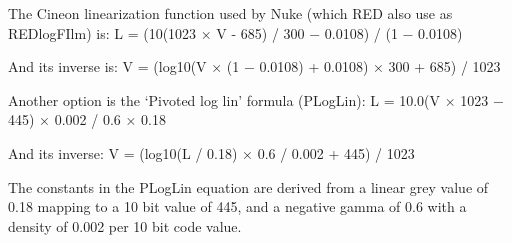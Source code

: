 The Cineon linearization function used by Nuke (which RED also use as REDlogFIlm) is:
	L = (10(1023 × V - 685) / 300 − 0.0108) / (1 − 0.0108)



And its inverse is:
	V = (log10(V × (1 − 0.0108) + 0.0108) × 300 + 685) / 1023

Another option is the ‘Pivoted log lin’ formula (PLogLin):
	L = 10.0(V × 1023 − 445) × 0.002 / 0.6 × 0.18



And its inverse:
	V = (log10(L / 0.18) × 0.6 / 0.002 + 445) / 1023

The constants in the PLogLin equation are derived from a linear grey value of 0.18 mapping to a 10 bit value of 445, and a negative gamma of 0.6 with a density of 0.002 per 10 bit code value.

